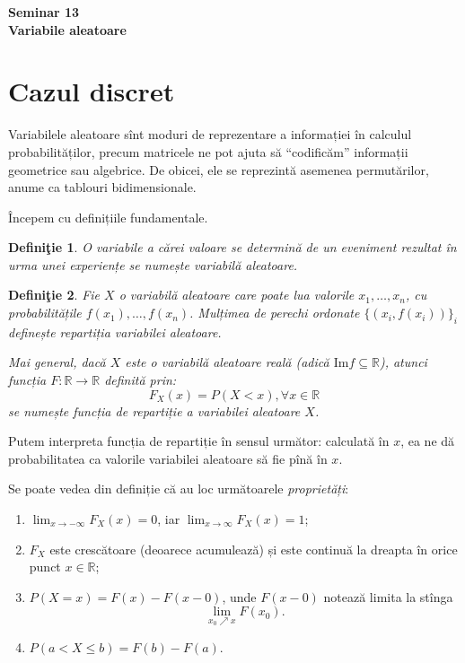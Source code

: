 \documentclass[12pt,a4paper]{article}
\newcommand\qq{\enquote}
\newcommand\ds{\displaystyle}
\newcommand\seq{\subseteq}
\newcommand\RR{\mathbb{R}}
\theoremstyle{dotless}
\theoremstyle{dotlessdr}
\newtheorem{definition}{Defini\c{t}ie}
\begin{document}
\begin{center}
  {\large\textbf{Seminar 13 \\
      Variabile aleatoare}}
\end{center}

\vspace{2cm}


\section*{Cazul discret}

\indent\indent Variabilele aleatoare sînt moduri de reprezentare a informației
în calculul probabilităților, precum matricele ne pot ajuta să \qq{codificăm}
informații geometrice sau algebrice. De obicei, ele se reprezintă asemenea
permutărilor, anume ca tablouri bidimensionale.

Începem cu definițiile fundamentale.

\begin{definition}\label{def:v-al}
  O variabile a cărei valoare se determină de un eveniment rezultat în urma
  unei experiențe se numește \emph{variabilă aleatoare}.
\end{definition}

\begin{definition}\label{def:repartitie}
  Fie $ X $ o variabilă aleatoare care poate lua valorile $ x_1, \dots, x_n $,
  cu probabilitățile $ f(x_1), \dots, f(x_n) $. Mulțimea de perechi ordonate
  $ \{ (x_i, f(x_i)) \}_i $ definește \emph{repartiția} variabilei aleatoare.

  Mai general, dacă $ X $ este o variabilă aleatoare reală (adică
  $ \mathrm{Im} f \seq \RR $), atunci funcția $ F : \RR \to \RR $ definită prin:
  \[
    F_X(x) = P(X < x), \forall x \in \RR
  \]
  se numește \emph{funcția de repartiție} a variabilei aleatoare $ X $.
\end{definition}

Putem interpreta funcția de repartiție în sensul următor: calculată în $ x $, ea
ne dă probabilitatea ca valorile variabilei aleatoare să fie pînă în $ x $.

Se poate vedea din definiție că au loc următoarele \emph{proprietăți}:
\begin{enumerate}[(1)]
\item $ \ds\lim_{x \to -\infty} F_X(x) = 0 $, iar $ \ds\lim_{x \to \infty} F_X(x) = 1 $;
\item $ F_X $ este crescătoare (deoarece acumulează) și este continuă la dreapta în
  orice punct $ x \in \RR $;
\item $ P(X = x) = F(x) - F(x - 0) $, unde $ F(x - 0) $ notează limita la stînga
  \[
    \lim_{x_0 \nearrow x} F(x_0).
  \]
\item $ P(a < X \leq b) = F(b) - F(a) $.
\end{enumerate}
\end{document}
